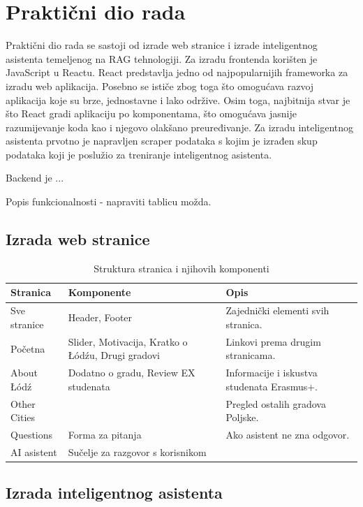 \documentclass[]{foi}
\begin{document}
\chapter{Praktični dio rada}
Praktični dio rada se sastoji od izrade web stranice i izrade inteligentnog asistenta temeljenog na RAG tehnologiji. Za izradu frontenda korišten je
JavaScript u Reactu. React predstavlja jedno od najpopularnijih frameworka za izradu web aplikacija. Posebno se ističe zbog toga što omogućava
razvoj aplikacija koje su brze, jednostavne i lako održive. Osim toga, najbitnija stvar je što React gradi aplikaciju po komponentama, što omogućava
jasnije razumijevanje koda kao i njegovo olakšano preuređivanje. Za izradu inteligentnog asistenta prvotno je napravljen scraper podataka s kojim je
izrađen skup podataka koji je poslužio za treniranje inteligentnog asistenta.

Backend je ...

Popis funkcionalnosti - napraviti tablicu možda.

\section{Izrada web stranice}

\begin{table}[h!]
    \centering
    \begin{tabular}{|l|p{7cm}|p{7cm}|}
    \hline
    \textbf{Stranica} & \textbf{Komponente} & \textbf{Opis} \\
    \hline
    Sve stranice & Header, Footer & Zajednički elementi svih stranica. \\
    \hline
    Početna & Slider, Motivacija, Kratko o Łódźu, Drugi gradovi & Linkovi prema drugim stranicama. \\
    \hline
    About \mbox{Łódź} & Dodatno o gradu, Review EX studenata & Informacije i iskustva studenata Erasmus+. \\
    \hline
    Other Cities &  & Pregled ostalih gradova Poljske. \\
    \hline
    Questions & Forma za pitanja & Ako asistent ne zna odgovor. \\
    \hline
    AI asistent & Sučelje za razgovor s korisnikom &  \\
    \hline
    \end{tabular}
    \caption{Struktura stranica i njihovih komponenti}
\end{table}

\section{Izrada inteligentnog asistenta}
\end{document}
